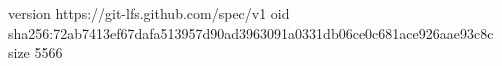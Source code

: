 version https://git-lfs.github.com/spec/v1
oid sha256:72ab7413ef67dafa513957d90ad3963091a0331db06ce0c681ace926aae93c8c
size 5566
